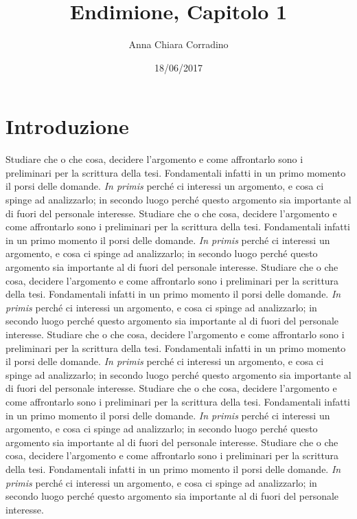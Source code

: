 \documentclass[12pt,a4paper,openright, oneside]{book}
\title{Endimione, Capitolo 1}
\author{Anna Chiara Corradino}
\date{18/06/2017}
\begin{document}
\maketitle
\thispagestyle{empty}
\renewcommand{\contentsname}{\textbf{Sommario}}
{\linespread{1}{\tableofcontents}}


\chapter*{Introduzione}
\renewcommand{\thechapter}{\Roman{chapter}}
\renewcommand{\thesection}{\thechapter \Roman{section}}
Studiare che o che cosa, decidere l'argomento e come affrontarlo sono i preliminari per la scrittura della tesi. Fondamentali infatti in un primo momento il porsi delle domande. \textit{In primis} perché ci interessi un argomento, e cosa ci spinge ad analizzarlo; in secondo luogo perché questo argomento sia importante al di fuori del personale interesse. Studiare che o che cosa, decidere l'argomento e come affrontarlo sono i preliminari per la scrittura della tesi. Fondamentali infatti in un primo momento il porsi delle domande. \textit{In primis} perché ci interessi un argomento, e cosa ci spinge ad analizzarlo; in secondo luogo perché questo argomento sia importante al di fuori del personale interesse. Studiare che o che cosa, decidere l'argomento e come affrontarlo sono i preliminari per la scrittura della tesi. Fondamentali infatti in un primo momento il porsi delle domande. \textit{In primis} perché ci interessi un argomento, e cosa ci spinge ad analizzarlo; in secondo luogo perché questo argomento sia importante al di fuori del personale interesse. 
Studiare che o che cosa, decidere l'argomento e come affrontarlo sono i preliminari per la scrittura della tesi. Fondamentali infatti in un primo momento il porsi delle domande. \textit{In primis} perché ci interessi un argomento, e cosa ci spinge ad analizzarlo; in secondo luogo perché questo argomento sia importante al di fuori del personale interesse. Studiare che o che cosa, decidere l'argomento e come affrontarlo sono i preliminari per la scrittura della tesi. Fondamentali infatti in un primo momento il porsi delle domande. \textit{In primis} perché ci interessi un argomento, e cosa ci spinge ad analizzarlo; in secondo luogo perché questo argomento sia importante al di fuori del personale interesse. Studiare che o che cosa, decidere l'argomento e come affrontarlo sono i preliminari per la scrittura della tesi. Fondamentali infatti in un primo momento il porsi delle domande. \textit{In primis} perché ci interessi un argomento, e cosa ci spinge ad analizzarlo; in secondo luogo perché questo argomento sia importante al di fuori del personale interesse. 
\end{document}
